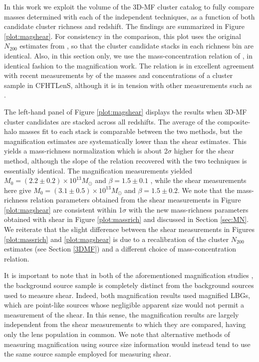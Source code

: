 In this work we exploit the volume of the \ac{3D-MF} cluster catalog to fully compare masses determined with each of the independent techniques, as a function of both candidate cluster richness and redshift. The findings are summarized in Figure \ref{plot:magshear}. For consistency in the comparison, this plot uses the original $N_{200}$ estimates from \citet{Ford14}, so that the cluster candidate stacks in each richness bin are identical. Also, in this section only, we use the mass-concentration relation of \citet{Prada12}, in identical fashion to the magnification work. The \citet{Prada12} relation is in excellent agreement with recent measurements by \citet{Covone14} of the masses and concentrations of a cluster sample in \ac{CFHTLenS}, although it is in tension with other measurements such as \citet{Merten14}. 

The left-hand panel of Figure \ref{plot:magshear} displays the results when \ac{3D-MF} cluster candidates are stacked across all redshifts. The average of the composite-halo masses fit to each stack is comparable between the two methods, but the magnification estimates are systematically lower than the shear estimates. This yields a mass-richness normalization which is about 2$\sigma$ higher for the shear method, although the slope of the relation recovered with the two techniques is essentially identical. The magnification measurements yielded $M_0 = (2.2 \pm 0.2) \times 10^{13} M_{\odot}$ and $\beta = 1.5 \pm 0.1$ \citep[see the miscenterd model in][]{Ford14}, while the shear measurements here give $M_0 = (3.1 \pm 0.5) \times 10^{13} M_{\odot}$ and $\beta = 1.5 \pm 0.2$. We note that the mass-richness relation parameters obtained from the shear measurements in Figure \ref{plot:magshear} are consistent within 1$\sigma$ with the new mass-richness parameters obtained with shear in Figure \ref{plot:massrich} and discussed in Section \ref{sec:MN}. We reiterate that the slight difference between the shear measurements in Figures \ref{plot:massrich} and \ref{plot:magshear} is due to a recalibration of the cluster $N_{200}$ estimates (see Section \ref{3DMF}) and a different choice of mass-concentration relation.

It is important to note that in both of the aforementioned magnification studies \citep{Ford12,Ford14}, the background source sample is completely distinct from the background sources used to measure shear. Indeed, both magnification results used magnified \ac{LBG}s, which are point-like sources whose negligible apparent size would not permit a measurement of the shear. In this sense, the magnification results are largely independent from the shear measurements to which they are compared, having only the lens population in common. We note that alternative methods of measuring magnification using source size information would instead tend to use the same source sample employed for measuring shear.


